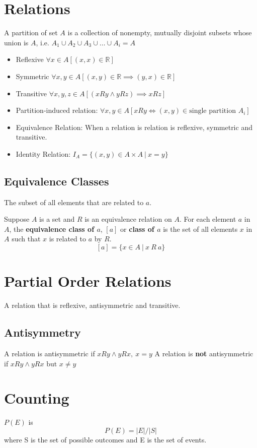 \documentclass[landscape, letterpaper, 8pt]{extarticle}
\begin{document}
\begin{multicols}{3}
    \section*{Relations}
    A partition of set $A$ is a collection of nonempty, mutually disjoint subsets whose union is $A$, i.e. $A_1 \cup A_2 \cup A_3 \cup \ldots \cup A_i = A$
    \begin{itemize}[noitemsep,nolistsep]
        \item Reflexive $\forall x \in A[(x, x) \in \mathbb{R}]$
        \item Symmetric $\forall x, y \in A[(x, y) \in \mathbb{R} \implies (y, x) \in \mathbb{R}]$
        \item Transitive $\forall x, y, z \in A[(x R y \land y R z)\implies x R z]$
        \item Partition-induced relation: $\forall x, y \in A[x R y \iff (x, y) \in \text{single partition }A_i]$
        \item Equivalence Relation: When a relation is relation is reflexive, symmetric and transitive.
        \item Identity Relation: $I_A = \{(x, y) \in A \times A~|~x=y\}$
    \end{itemize}
    \subsection*{Equivalence Classes}
    The subset of all elements that are related to $a$.

    Suppose $A$ is a set and $R$ is an equivalence relation on $A$. For each element $a$ in $A$, the \textbf{equivalence class of $a$}, $[a]$ or \textbf{class of $a$} is the set of all elements $x$ in $A$ such that $x$ is related to $a$ by $R$. $$[a] = \{x \in A~|~x~R~a\}$$
    \section*{Partial Order Relations}
    A relation that is reflexive, antisymmetric and transitive.
    \subsection*{Antisymmetry}
    A relation is antisymmetric if $x R y \land y R x,~x = y$
    A relation is \textbf{not} antisymmetric if $x R y \land y R x\text{ but }x \neq y$
    \section*{Counting}
    $P(E)$ is $$ P(E) = |E|/|S|$$ where S is the set of possible outcomes and E is the set of events.


\end{multicols}
\end{document}
